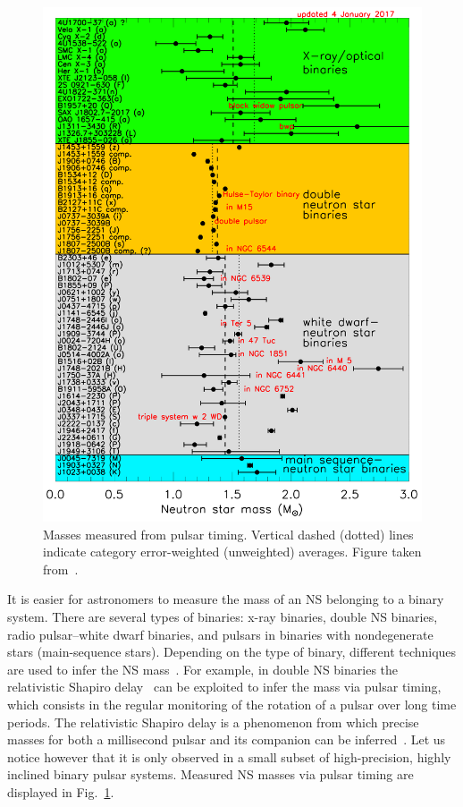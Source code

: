 \begin{figure}[!t]
\begin{center}
  \includegraphics[width=0.7\linewidth]{figures/masses.png}
\end{center}
\caption[Masses measured from pulsar timing]{Masses 
measured from pulsar timing. Vertical dashed (dotted) lines indicate category 
error-weighted (unweighted) averages. Figure taken 
from~\cite{Lattimer2019}.}\label{fig:masses_lattimer}
\end{figure}
%
It is easier for astronomers to measure the mass of an NS belonging to a binary 
system. There are several types of binaries: x-ray binaries, double NS 
binaries, radio pulsar--white dwarf binaries, and {pulsars in binaries 
with nondegenerate stars (main-sequence stars).} Depending on the type 
  of binary, different techniques are used to infer the NS 
  mass~\cite{Haensel2007}.
For example, {in double NS binaries} the relativistic Shapiro 
delay~\cite{Shapiro1964} can be exploited to infer the mass via pulsar timing, 
which consists in the regular monitoring of 
the rotation of a pulsar {over long time periods}. The relativistic 
Shapiro delay is a phenomenon from which precise masses for both a millisecond 
pulsar and its companion can be inferred~\cite{Demorest2010,Cromartie2020}. Let 
us notice however that it is only observed in a small subset of high-precision, 
highly inclined binary pulsar systems. Measured NS masses via pulsar timing are
displayed in Fig.~\ref{fig:masses_lattimer}. 

